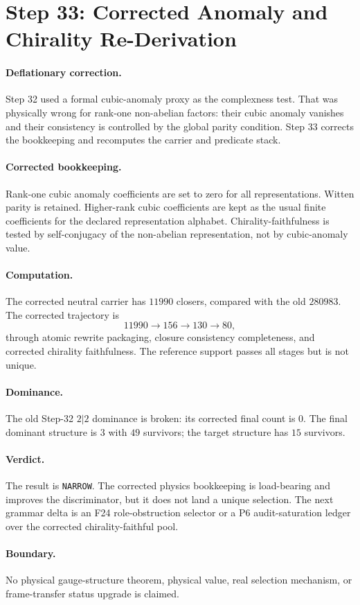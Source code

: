 \section{Step 33: Corrected Anomaly and Chirality Re-Derivation}

\paragraph{Deflationary correction.}
Step 32 used a formal cubic-anomaly proxy as the complexness test.  That was physically wrong for rank-one non-abelian factors: their cubic anomaly vanishes and their consistency is controlled by the global parity condition.  Step 33 corrects the bookkeeping and recomputes the carrier and predicate stack.

\paragraph{Corrected bookkeeping.}
Rank-one cubic anomaly coefficients are set to zero for all representations.  Witten parity is retained.  Higher-rank cubic coefficients are kept as the usual finite coefficients for the declared representation alphabet.  Chirality-faithfulness is tested by self-conjugacy of the non-abelian representation, not by cubic-anomaly value.

\paragraph{Computation.}
The corrected neutral carrier has \(11990\) closers, compared with the old \(280983\).  The corrected trajectory is
\[
11990 \rightarrow 156 \rightarrow 130 \rightarrow 80,
\]
through atomic rewrite packaging, closure consistency completeness, and corrected chirality faithfulness.  The reference support passes all stages but is not unique.

\paragraph{Dominance.}
The old Step-32 \(2|2\) dominance is broken: its corrected final count is \(0\).  The final dominant structure is \(3\) with \(49\) survivors; the target structure has \(15\) survivors.

\paragraph{Verdict.}
The result is \texttt{NARROW}.  The corrected physics bookkeeping is load-bearing and improves the discriminator, but it does not land a unique selection.  The next grammar delta is an F24 role-obstruction selector or a P6 audit-saturation ledger over the corrected chirality-faithful pool.

\paragraph{Boundary.}
No physical gauge-structure theorem, physical value, real selection mechanism, or frame-transfer status upgrade is claimed.

